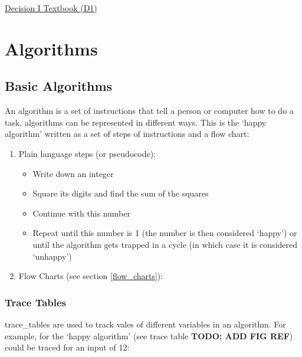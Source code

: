 \href{https://drive.google.com/drive/folders/1sP9eVbfbHurmlSf9t7K7DOXmUspDS0hR}{\hypertarget{book:D1}{Decision I Textbook (D1)}}

\section{Algorithms} \label{algorithms}
    \subsection{Basic Algorithms}
        An \gls{algorithm} is a set of instructions that tell a person or computer how to do a task. 
        \Glspl{algorithm} can be represented in different ways.
        This is the `happy algorithm' written as a set of steps of instructions and a flow chart:
        \begin{enumerate}
            \item Plain language steps (or pseudocode):
                \begin{itemize}
                    \item Write down an \gls{integer}
                    \item Square its digits and find the sum of the squares
                    \item Continue with this number
                    \item Repeat until this number is 1 (the number is then considered `happy') or until the \gls{algorithm} gets trapped in a cycle (in which case it is considered `unhappy')
                \end{itemize}
            \item Flow Charts (see section \ref{flow_charts}):
        \end{enumerate}

        \subsubsection{Trace Tables}
        \Glspl{trace_table} are used to track vales of different variables in an \gls{algorithm}.
        For example, for the `happy \gls{algorithm}' (see trace table \textbf{TODO: ADD FIG REF}) could be traced for an input of 12:

